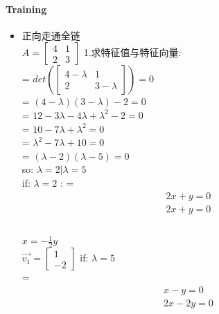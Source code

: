 \documentclass[12pt]{article}
\begin{document}
\paragraph{Training}
\begin{flushleft}
    \begin{itemize}
        \item  正向走通全链 \\
              $A = \begin{bmatrix}
                      4 & 1 \\
                      2 & 3
                  \end{bmatrix}$
              1.求特征值与特征向量: \\
              = $det (\begin{bmatrix}
                      4 - \lambda & 1           \\
                      2           & 3 - \lambda
                  \end{bmatrix} )  = 0 $\\
              = $(4 - \lambda)(3-\lambda) - 2 = 0$ \\
              = $12 - 3\lambda - 4\lambda + \lambda^{2} - 2 = 0 $ \\
              = $10 - 7\lambda  + \lambda^{2} = 0 $ \\
              = $\lambda^{2} - 7\lambda + 10 = 0$ \\
              = $(\lambda - 2)(\lambda - 5) = 0$ \\
              so: $\lambda = 2 | \lambda = 5$ \\
              if: $\lambda = 2$ :
              =   \begin{align}
                  2x  + y  = 0 \\
                  2x  + y  = 0 \\
              \end{align} \\
              $x = -\frac{1}{2}y $ \\
              $\vec{v_{1}} = \begin{bmatrix}
                      1 \\
                      -2
                  \end{bmatrix}$
              if: $\lambda  = 5$ \\
              =  \begin{align}
                  x   - y  = 0 \\
                  2x  -2y  = 0 \\

\end{align}
\end{itemize}
\end{flushleft}
\end{document}
